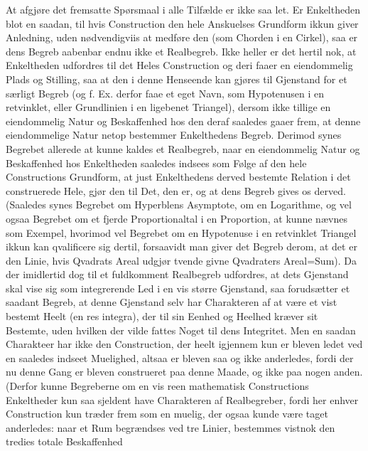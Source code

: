 \documentclass[12pt]{book}
\def\textit#1{#1}%
\def\emph#1{#1}%
\newcommand{\opage}[1]{\marginnote{\footnotesize\textit{[#1]}}}
\begin{document}
At afgjøre det fremsatte Spørsmaal i alle Tilfælde er ikke saa let. Er
Enkeltheden blot en saadan, til hvis Construction den hele Anskuelses Grundform
ikkun giver Anledning, uden nødvendigviis at medføre den (som Chorden i en
Cirkel), saa er dens Begreb aabenbar endnu ikke et Realbegreb. Ikke heller er
det hertil nok, at Enkeltheden udfordres til det Heles Construction og deri
faaer en eiendommelig Plads og Stilling, saa at den i denne Henseende kan
gjøres til Gjenstand for et særligt Begreb (og f. Ex. derfor faae et eget Navn,
som Hypotenusen i en retvinklet, eller Grundlinien i en ligebenet Triangel),
dersom ikke tillige en eiendommelig Natur og Beskaffenhed hos den deraf
saaledes gaaer frem, at denne eiendommelige Natur netop bestemmer Enkelthedens
Begreb. Derimod synes Begrebet allerede at kunne kaldes et Realbegreb, naar en
eiendommelig Natur og Beskaffenhed hos Enkeltheden saaledes indsees som Følge
af den hele Constructions Grundform, at just Enkelthedens derved bestemte
Relation i det
\opage{174} construerede Hele, gjør den til Det, den er, og at dens Begreb gives os derved.
(Saaledes synes Begrebet om Hyperblens Asymptote, om en Logarithme, og vel
ogsaa Begrebet om et fjerde Proportionaltal i en Proportion, at kunne nævnes
som Exempel, hvorimod vel Begrebet om en Hypotenuse i en retvinklet Triangel
ikkun kan qvalificere sig dertil, forsaavidt man giver det Begreb derom, at det
er den Linie, hvis Qvadrats Areal udgjør tvende givne Qvadraters Areal=Sum).
Da der imidlertid dog til et fuldkomment Realbegreb udfordres, at dets
Gjenstand skal vise sig som integrerende Led i en vis større Gjenstand, saa
forudsætter et saadant Begreb, at denne Gjenstand selv har Charakteren af at
være et vist bestemt Heelt (en \textit{res integra}), der til sin Eenhed og
Heelhed kræver sit Bestemte, uden hvilken der vilde fattes Noget til dens
Integritet. Men en saadan Charakteer har ikke den Construction, der heelt
igjennem kun er bleven ledet ved en saaledes indseet
\emph{Muelighed}, altsaa er bleven saa og ikke anderledes, fordi der nu denne
Gang er bleven construeret paa denne Maade, og ikke paa nogen anden. (Derfor
kunne Begreberne om en vis reen mathematisk Constructions Enkeltheder kun saa
sjeldent have Charakteren af Realbegreber, fordi her enhver Construction kun
træder frem som en muelig, der ogsaa kunde være taget anderledes: naar et Rum
begrændses ved tre Linier, bestemmes vistnok den tredies totale Beskaffenhed
\end{document}
